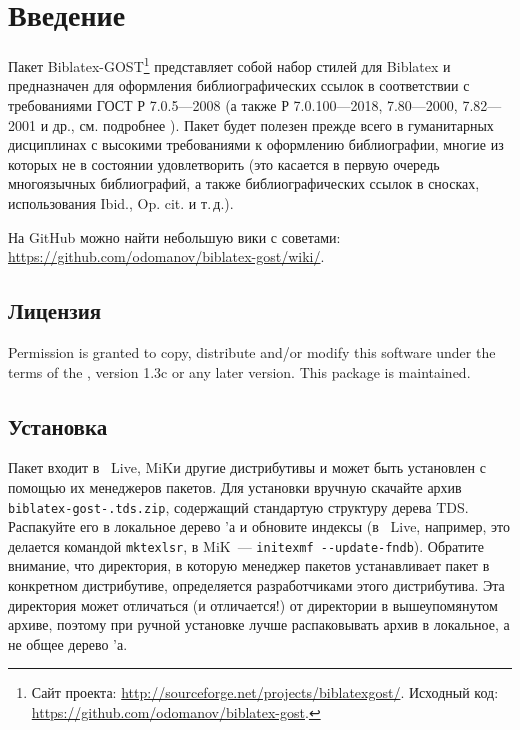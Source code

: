 \documentclass[10pt,a4paper,headings=small,numbers=enddot,english,russian]{ltxdockit}
\newcommand*{\biblatex}{Biblatex\xspace}
\newcommand*{\biblatexgost}{Biblatex-GOST\xspace}
\begin{document}
\printtitlepage
\tableofcontents
\listoftables

\section{Введение}
\label{sec:int}

Пакет \biblatexgost{}\footnote{Сайт проекта:
  \url{http://sourceforge.net/projects/biblatexgost/}. Исходный код:
  \url{https://github.com/odomanov/biblatex-gost}.} представляет собой
набор стилей для
\biblatex{}\unspace{}
и предназначен для оформления библиографических ссылок в соответствии
с требованиями ГОСТ Р 7.0.5---2008 (а также Р 7.0.100---2018, 7.80---2000,
7.82---2001 и др., см. подробнее ).
Пакет будет полезен прежде всего в гуманитарных дисциплинах с высокими
требованиями к оформлению библиографии, многие из которых \bibtex не в
состоянии удовлетворить (это касается в первую очередь многоязычных
библиографий, а также библиографических ссылок в сносках,
использования Ibid., Op. cit. и т.\,д.).

На GitHub можно найти небольшую вики с советами:
\url{https://github.com/odomanov/biblatex-gost/wiki/}.

\subsection{Лицензия}
\label{sec:lic}

Permission is granted to copy, distribute and\slash or modify this software under the
terms of the \lppl, version 1.3c or any later
version.
This package is maintained.

\subsection{Установка}
\label{sec:install}

Пакет входит в \tex~Live, MiK\tex и другие дистрибутивы и может быть установлен
с помощью их менеджеров пакетов. Для установки вручную скачайте архив
\texttt{biblatex-gost-.tds.zip}, содержащий стандартую структуру дерева TDS.
Распакуйте его в локальное дерево \tex'а и
обновите индексы (в \tex~Live, например, это делается командой \texttt{mktexlsr},
в MiK\tex~--- \texttt{initexmf -{}-update-fndb}). Обратите внимание, что директория,
в которую менеджер пакетов устанавливает пакет в конкретном дистрибутиве,
определяется разработчиками этого дистрибутива.
Эта директория может отличаться (и отличается!) от директории
в вышеупомянутом архиве, поэтому при ручной установке лучше распаковывать
архив в локальное, а не общее дерево \tex'а.
\end{document}
